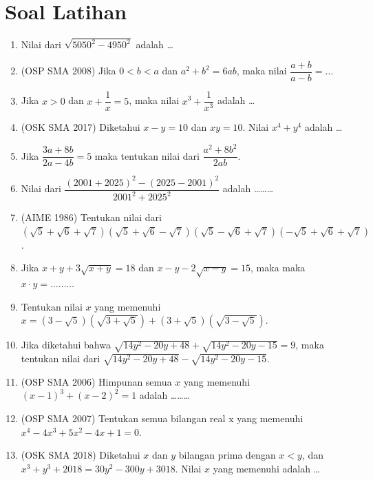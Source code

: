 \documentclass[12pt]{scrartcl}
\begin{document}
\section{Soal Latihan}
\begin{enumerate}

    \item  Nilai dari $\sqrt{5050^2-4950^2}$ adalah \dots

    \item (OSP SMA 2008) Jika $0 < b < a$ dan $a^2+b^2=6ab$, maka nilai $\dfrac{a+b}{a-b}=\dots$
    
    \item Jika $x > 0$ dan $x + \dfrac{1}{x} =  5$, maka nilai $x^3+\dfrac{1}{x^3}$ adalah \dots
    
    \item (OSK SMA 2017) Diketahui $x-y=10$ dan $xy=10$. Nilai $x^4+y^4$ adalah \dots
    
    \item Jika $\dfrac{3a+8b}{2a-4b} = 5$ maka tentukan nilai dari $\dfrac{a^2+8b^2}{2ab}$.

    \item Nilai dari $\dfrac{(2001+2025)^2-(2025-2001)^2}{2001^2+2025^2}$ adalah \dots\dots\dots

    \item (AIME 1986) Tentukan nilai dari $(\sqrt{5}+\sqrt{6}+\sqrt{7})(\sqrt{5}+\sqrt{6}-\sqrt{7})(\sqrt{5}-\sqrt{6}+\sqrt{7})(-\sqrt{5}+\sqrt{6}+\sqrt{7})$.

    \item Jika $x+y+3\sqrt{x+y}=18$ dan $x-y-2\sqrt{x-y}=15$, maka maka $x \cdot y = \dots\dots\dots$

    \item Tentukan nilai $x$ yang memenuhi $x = (3-\sqrt{5})(\sqrt{3+\sqrt{5}}) + (3+\sqrt{5})(\sqrt{3-\sqrt{5}})$.

    \item Jika diketahui bahwa $\sqrt{14y^2-20y+48} + \sqrt{14y^2-20y-15} = 9$, maka tentukan nilai dari $\sqrt{14y^2-20y+48} - \sqrt{14y^2-20y-15}$.

    \item (OSP SMA 2006) Himpunan semua $x$ yang memenuhi $(x-1)^3+(x-2)^2=1$ adalah \dots\dots\dots

    \item (OSP SMA 2007) Tentukan semua bilangan real x yang memenuhi $x^4 - 4x^3 + 5x^2 - 4x + 1 = 0$.

    \item (OSK SMA 2018) Diketahui $x$ dan $y$ bilangan prima dengan $x < y$, dan $x^3+y^3+2018=30y^2-300y+3018$. Nilai $x$ yang memenuhi adalah \dots
    

\end{enumerate}
\end{document}
